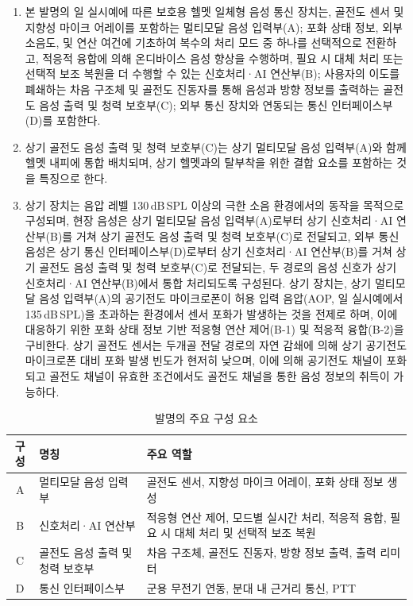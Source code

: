 \documentclass{article}
\DeclareRobustCommand{\codexedit}[1]{\textcolor{customorange}{#1}}
\begin{document}
\begin{enumerate}[label = \textbf{(S.\arabic*)}]

    \item 본 발명의 일 실시예에 따른 보호용 헬멧 일체형 음성 통신 장치는,
    골전도 센서 및 지향성 마이크 어레이를 포함하는 멀티모달 음성 입력부(A);
    \codexedit{포화 상태 정보, 외부 소음도, 및 연산 여건에 기초하여 복수의 처리 모드 중 하나를 선택적으로 전환하고, 적응적 융합에 의해 온디바이스 음성 향상을 수행하며, 필요 시 대체 처리 또는 선택적 보조 복원을 더 수행할 수 있는 신호처리·AI 연산부(B);}
    사용자의 이도를 폐쇄하는 차음 구조체 및 골전도 진동자를 통해 음성과 방향 정보를 출력하는 골전도 음성 출력 및 청력 보호부(C);
    외부 통신 장치와 연동되는 통신 인터페이스부(D)를 포함한다.

    \item 상기 골전도 음성 출력 및 청력 보호부(C)는 상기 멀티모달
    음성 입력부(A)와 함께 헬멧 내피에 통합 배치되며, 상기 헬멧과의
    탈부착을 위한 결합 요소를 포함하는 것을 특징으로 한다.

    \item 상기 장치는 음압 레벨 130\,dB\,SPL 이상의 극한 소음 환경에서의 동작을 목적으로 구성되며, 현장 음성은 상기 멀티모달 음성 입력부(A)로부터 상기 신호처리·AI 연산부(B)를 거쳐 상기 골전도 음성 출력 및 청력 보호부(C)로 전달되고, 외부 통신 음성은 상기 통신 인터페이스부(D)로부터 상기 신호처리·AI 연산부(B)를 거쳐 상기 골전도 음성 출력 및 청력 보호부(C)로 전달되는, 두 경로의 음성 신호가 상기 신호처리·AI 연산부(B)에서 통합 처리되도록 구성된다. 상기 장치는, 상기 멀티모달 음성 입력부(A)의 공기전도 마이크로폰이 허용 입력 음압(AOP, 일 실시예에서 135\,dB\,SPL)을 초과하는 환경에서 센서 포화가 발생하는 것을 전제로 하며, 이에 대응하기 위한 포화 상태 정보 기반 적응형 연산 제어(B-1) 및 적응적 융합(B-2)을 구비한다. 상기 골전도 센서는 두개골 전달 경로의 자연 감쇄에 의해 상기 공기전도 마이크로폰 대비 포화 발생 빈도가 현저히 낮으며, 이에 의해 공기전도 채널이 포화되고 골전도 채널이 유효한 조건에서도 골전도 채널을 통한 음성 정보의 취득이 가능하다.
\end{enumerate}


\begin{table}[!h]
    \centering
    \begin{tabular}{c|l|l}
        \hline
        구성 & 명칭 & 주요 역할 \\
        \hline\hline
        A & 멀티모달 음성 입력부
          & 골전도 센서, 지향성 마이크 어레이, 포화 상태 정보 생성 \\
        B & 신호처리·AI 연산부
          & \codexedit{적응형 연산 제어, 모드별 실시간 처리, 적응적 융합, 필요 시 대체 처리 및 선택적 보조 복원} \\
        C & 골전도 음성 출력 및 청력 보호부
          & 차음 구조체, 골전도 진동자, 방향 정보 출력, 출력 리미터 \\
        D & 통신 인터페이스부
          & 군용 무전기 연동, 분대 내 근거리 통신, PTT \\
        \hline
    \end{tabular}
    \caption{발명의 주요 구성 요소}
    \label{tab:components}
\end{table}
\end{document}
